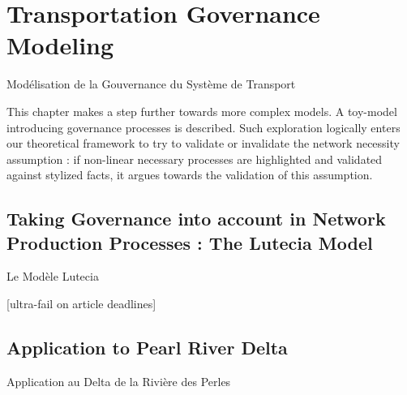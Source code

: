 




\chapter{Transportation Governance Modeling}{Modélisation de la Gouvernance du Système de Transport} %

\label{ch:lutetia} %



This chapter makes a step further towards more complex models. A toy-model introducing governance processes is described. Such exploration logically enters our theoretical framework to try to validate or invalidate the network necessity assumption : if non-linear necessary processes are highlighted and validated against stylized facts, it argues towards the validation of this assumption. 






\section[The Lutecia Model][Le Modèle Lutecia]{Taking Governance into account in Network Production Processes : The Lutecia Model}{Le Modèle Lutecia}



[ultra-fail on article deadlines]









\section[Application][Application]{Application to Pearl River Delta}{Application au Delta de la Rivière des Perles}





